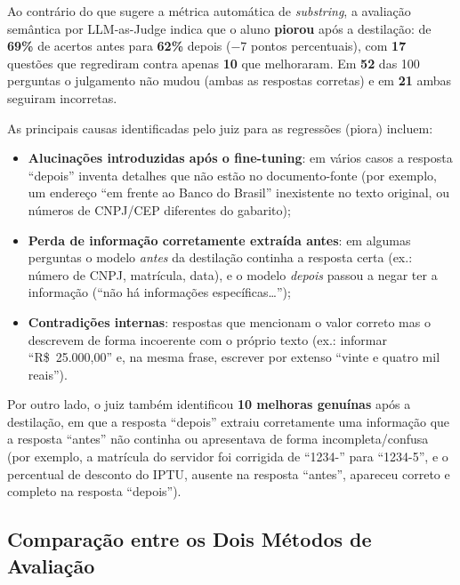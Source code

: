 \documentclass[12pt, a4paper]{article}
\begin{document}
\begin{warningbox}
Ao contrário do que sugere a métrica automática de \textit{substring}, a avaliação
semântica por LLM-as-Judge indica que o aluno \textbf{piorou} após a destilação:
de \textbf{69\%} de acertos antes para \textbf{62\%} depois ($-7$ pontos percentuais),
com \textbf{17} questões que regrediram contra apenas \textbf{10} que melhoraram.
Em \textbf{52} das 100 perguntas o julgamento não mudou (ambas as respostas corretas)
e em \textbf{21} ambas seguiram incorretas.
\end{warningbox}

As principais causas identificadas pelo juiz para as regressões (piora) incluem:
\begin{itemize}
  \item \textbf{Alucinações introduzidas após o fine-tuning}: em vários casos a
        resposta ``depois'' inventa detalhes que não estão no documento-fonte
        (por exemplo, um endereço ``em frente ao Banco do Brasil'' inexistente no
        texto original, ou números de CNPJ/CEP diferentes do gabarito);
  \item \textbf{Perda de informação corretamente extraída antes}: em algumas
        perguntas o modelo \textit{antes} da destilação continha a resposta certa
        (ex.: número de CNPJ, matrícula, data), e o modelo \textit{depois} passou a
        negar ter a informação (``não há informações específicas\ldots'');
  \item \textbf{Contradições internas}: respostas que mencionam o valor correto mas
        o descrevem de forma incoerente com o próprio texto (ex.: informar
        ``R\$~25.000,00'' e, na mesma frase, escrever por extenso ``vinte e quatro
        mil reais'').
\end{itemize}

Por outro lado, o juiz também identificou \textbf{10 melhoras genuínas} após a
destilação, em que a resposta ``depois'' extraiu corretamente uma informação que a
resposta ``antes'' não continha ou apresentava de forma incompleta/confusa (por
exemplo, a matrícula do servidor foi corrigida de ``1234-'' para ``1234-5'', e o
percentual de desconto do IPTU, ausente na resposta ``antes'', apareceu correto e
completo na resposta ``depois'').

\subsection{Comparação entre os Dois Métodos de Avaliação}
\end{document}
